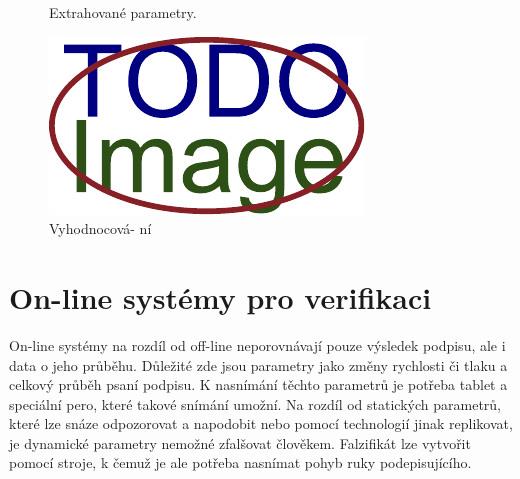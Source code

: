 \begin{figure}[h]
\begin{minipage}{0.3\textwidth}
    \caption{Extrahované parametry.}
    \label{fig:second-image}
  \end{minipage}\hfill
  \begin{minipage}{0.3\textwidth}
    \centering
    \includegraphics[width=\textwidth]{obrazky-figures/placeholder.pdf}
    \caption{Vyhodnocová- ní}
    \label{fig:third-image}
  \end{minipage}
\end{figure}


\section{On-line systémy pro verifikaci} 
On-line systémy na rozdíl od off-line neporovnávají pouze výsledek podpisu, ale i data o jeho průběhu. %
Důležité zde jsou parametry jako změny rychlosti či tlaku a celkový průběh psaní podpisu.              %
K nasnímání těchto parametrů je potřeba tablet a speciální pero, které takové snímání umožní.          %
Na rozdíl od statických parametrů, které lze snáze odpozorovat a napodobit                             %
nebo pomocí technologií jinak replikovat, je dynamické parametry nemožné zfalšovat člověkem.           %
Falzifikát lze vytvořit pomocí stroje, k čemuž je ale potřeba nasnímat pohyb ruky podepisujícího.~\cite{VaccaJohnR2007}%

